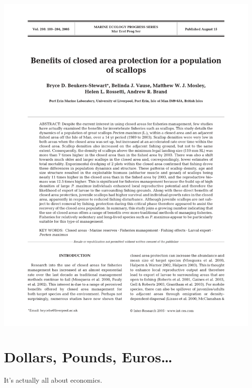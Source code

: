 \documentclass[
]{book}
\begin{document}
\begin{center}\includegraphics[width=1\linewidth]{_images/benefits} \end{center}

\hypertarget{dollars-pounds-euros}{%
\chapter{Dollars, Pounds, Euros\ldots{}}\label{dollars-pounds-euros}}

It's actually all about economics.
\end{document}
